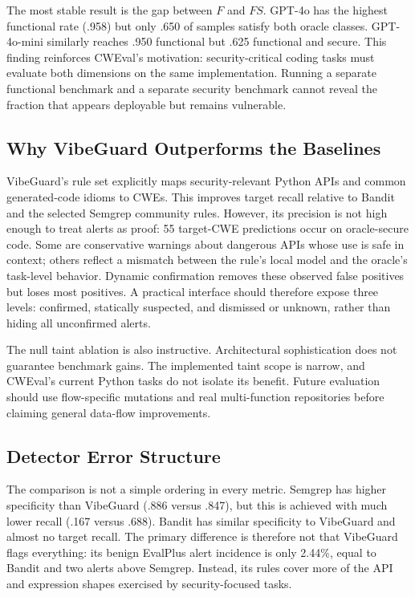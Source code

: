\documentclass[sigconf,nonacm]{acmart}
\begin{document}
The most stable result is the gap between $F$ and $FS$. GPT-4o has the highest
functional rate (.958) but only .650 of samples satisfy both oracle classes.
GPT-4o-mini similarly reaches .950 functional but .625 functional and secure.
This finding reinforces CWEval's motivation: security-critical coding tasks
must evaluate both dimensions on the same implementation. Running a separate
functional benchmark and a separate security benchmark cannot reveal the
fraction that appears deployable but remains vulnerable.

\subsection{Why VibeGuard Outperforms the Baselines}

VibeGuard's rule set explicitly maps security-relevant Python APIs and common
generated-code idioms to CWEs. This improves target recall relative to Bandit
and the selected Semgrep community rules. However, its precision is not high
enough to treat alerts as proof: 55 target-CWE predictions occur on
oracle-secure code. Some are conservative warnings about dangerous APIs whose
use is safe in context; others reflect a mismatch between the rule's local
model and the oracle's task-level behavior. Dynamic confirmation removes these
observed false positives but loses most positives. A practical interface should
therefore expose three levels: confirmed, statically suspected, and dismissed
or unknown, rather than hiding all unconfirmed alerts.

The null taint ablation is also instructive. Architectural sophistication does
not guarantee benchmark gains. The implemented taint scope is narrow, and
CWEval's current Python tasks do not isolate its benefit. Future evaluation
should use flow-specific mutations and real multi-function repositories before
claiming general data-flow improvements.

\subsection{Detector Error Structure}

The comparison is not a simple ordering in every metric. Semgrep has higher
specificity than VibeGuard (.886 versus .847), but this is achieved with much
lower recall (.167 versus .688). Bandit has similar specificity to VibeGuard
and almost no target recall. The primary difference is therefore not that
VibeGuard flags everything: its benign EvalPlus alert incidence is only 2.44\%,
equal to Bandit and two alerts above Semgrep. Instead, its rules cover more of
the API and expression shapes exercised by security-focused tasks.
\end{document}
